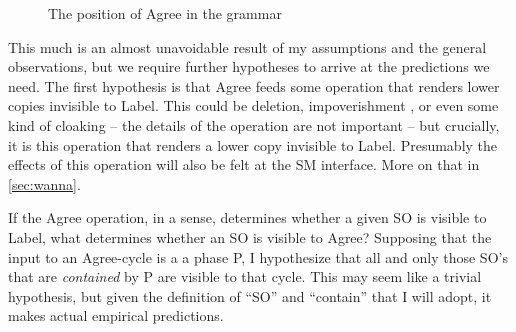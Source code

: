 \documentclass[MilwayThesis]{subfiles}
\begin{document}
\begin{figure}[h]
  \centering
  \caption{The position of Agree in the grammar}
  \label{fig:SepCycles}
\end{figure}

This much is an almost unavoidable result of my assumptions and the general observations, but we require further hypotheses to arrive at the predictions we need.
The first hypothesis is that Agree feeds some operation that renders lower copies invisible to Label.
This could be deletion, impoverishment , or even some kind of cloaking -- the details of the operation are not important -- but crucially, it is this operation that renders a lower copy invisible to Label.
Presumably the effects of this operation will also be felt at the SM interface.
More on that in \cref{sec:wanna}.

If the Agree operation, in a sense, determines whether a given SO is visible to Label, what determines whether an SO is visible to Agree?
Supposing that the input to an Agree-cycle is a a phase P, I hypothesize that all and only those SO's that are \textit{contained} by P are visible to that cycle.
This may seem like a trivial hypothesis, but given the definition of ``SO'' and ``contain'' that I will adopt, it makes actual empirical predictions.
\end{document}
